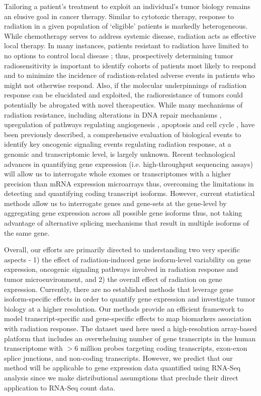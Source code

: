 \documentclass[hidelinks,11pt]{article}
\begin{document}
Tailoring a patient's treatment to exploit an individual's tumor biology remains an elusive goal in cancer therapy.  Similar to cytotoxic therapy, response to radiation in a given population of `eligible' patients is markedly heterogeneous. While chemotherapy serves to address systemic disease, radiation acts as effective local therapy.  In many instances, patients resistant to radiation have limited to no options to control local disease \cite{roca,roca_eschrich,baumann_krause}; thus, prospectively determining tumor radiosensitivity is important to identify cohorts of patients most likely to respond and to minimize the incidence of radiation-related adverse events in patients who might not otherwise respond. Also, if the molecular underpinnings of radiation response can be elucidated and exploited, the radioresistance of tumors could potentially be abrogated with novel therapeutics. While many mechanisms of radiation resistance, including alterations in DNA repair mechanisms \cite{dna_repair}, upregulation of pathways regulating angiogenesis \cite{angio}, apoptosis \cite{apoptosis} and cell cycle \cite{cell_cycle}, have been previously described, a comprehensive evaluation of biological events to identify key oncogenic signaling events regulating radiation response, at a genomic and transcriptomic level, is largely unknown. Recent technological advances in quantifying gene expression (i.e. high-throughput sequencing assays) will allow us to interrogate whole exomes or transcriptomes with a higher precision than mRNA expression microarrays thus, overcoming the limitations in detecting and quantifying coding transcript isoforms. However, current statistical methods allow us to interrogate genes and gene-sets at the gene-level by aggregating gene expression across all possible gene isoforms thus, not taking advantage of alternative splicing mechanisms that result in multiple isoforms of the same gene. 

Overall, our efforts are primarily directed to understanding two very specific aspects - 1) the effect of radiation-induced gene isoform-level variability on gene expression, oncogenic signaling pathways involved in radiation response and tumor microenvironment, and 2) the overall effect of radiation on gene expression. Currently, there are no established methods that leverage gene isoform-specific effects in order to quantify gene expression and investigate tumor biology at a higher resolution. Our methods provide an efficient framework to model transcript-specific and gene-specific effects to map biomarkers association with radiation response. The dataset used here used a high-resolution array-based platform that includes an overwhelming number of gene transcripts in the human transcriptome with $>$6 million probes targeting coding transcripts, exon-exon splice junctions, and non-coding transcripts. 
However, we predict that our method will be applicable to gene expression data quantified using RNA-Seq analysis since we make distributional assumptions that preclude their direct application to RNA-Seq count data. 
\end{document}
